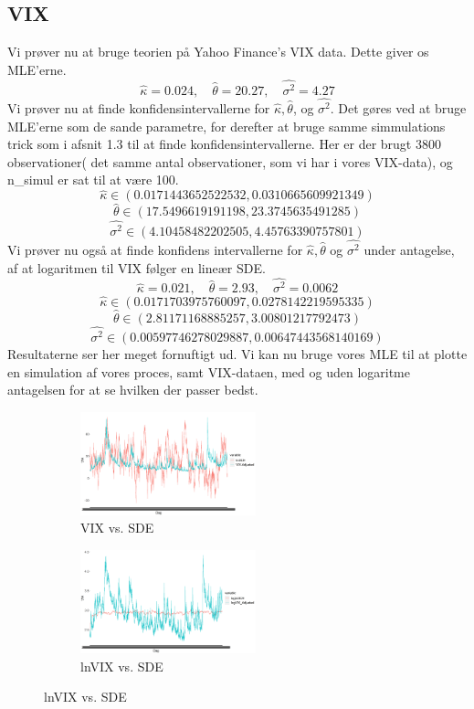 \documentclass{article}
\theoremstyle{definition}
\theoremstyle{remark}
\begin{document}
\subsection{VIX}
Vi prøver nu at bruge teorien på Yahoo Finance's VIX data. Dette giver os MLE'erne.
$$\hat \kappa=0.024 ,\quad \hat \theta =20.27,\quad \hat{\sigma^2}= 4.27$$
Vi prøver nu at finde konfidensintervallerne for $\hat\kappa,\hat \theta$, og $\hat{\sigma^2}$. Det gøres ved at bruge MLE'erne som de sande parametre, for derefter at bruge samme simmulations trick som i afsnit 1.3 til at finde konfidensintervallerne. Her er der brugt 3800 observationer( det samme antal observationer, som vi har i vores VIX-data), og n\_simul er sat til at være 100.
 $$\hat\kappa\in(0.0171443652522532,0.0310665609921349)$$
 $$\hat\theta\in(17.5496619191198 ,23.3745635491285)$$
 $$\hat{\sigma^2}\in(4.10458482202505,4.45763390757801)$$
Vi prøver nu også at finde konfidens intervallerne for $\hat\kappa,\hat \theta$ og $\hat{\sigma^2}$ under antagelse, af at logaritmen til VIX følger en lineær SDE.
$$\hat \kappa=0.021 ,\quad \hat \theta =2.93,\quad \hat{\sigma^2}= 0.0062$$
 $$\hat\kappa\in(0.0171703975760097,0.0278142219595335)$$
 $$\hat\theta\in(2.81171168885257 ,3.00801217792473)$$
 $$\hat{\sigma^2}\in(0.00597746278029887,0.00647443568140169)$$
Resultaterne ser her meget fornuftigt ud. Vi kan nu bruge vores MLE til at plotte en simulation af vores proces, samt VIX-dataen, med og uden logaritme antagelsen for at se hvilken der passer bedst.
\begin{figure}
\centering
\begin{subfigure}{2in}
    \raggedright
    \includegraphics[width=2in]{simul_VIX_OU}
    \caption{VIX vs. SDE}
    \label{fig:VIX}
\end{subfigure}
\begin{subfigure}{2in}
    \raggedleft
    \includegraphics[width=2in]{simul_lnVIX_OU}
    \caption{lnVIX vs. SDE}
    \label{fig:logVIX}
\end{subfigure}
\end{figure}
\end{document}
